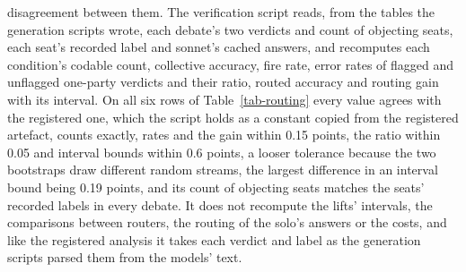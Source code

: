 disagreement between them. The verification script reads, from the tables
the generation scripts wrote, each debate's two verdicts and count of
objecting seats, each seat's recorded label and sonnet's cached answers, and
recomputes each condition's codable
count, collective accuracy, fire rate, error rates of flagged and unflagged
one-party verdicts and their ratio, routed accuracy and routing gain with its
interval. On all six rows of Table~\ref{tab-routing} every value agrees with
the registered one,
which the script holds as a constant copied from the registered artefact,
counts exactly, rates and the gain within 0.15 points, the ratio within 0.05
and interval bounds within 0.6 points, a looser tolerance because the two
bootstraps draw different random streams, the largest difference in an
interval bound being 0.19 points, and its count of objecting seats matches
the seats' recorded labels in every debate. It does not recompute the lifts'
intervals, the comparisons between routers, the routing of the solo's
answers or the costs, and like the registered analysis it takes each verdict
and label as the generation scripts parsed them from the models' text.

\begin{table}[t]
\centering
\caption{\textbf{The intervals of Table~\ref{tab-routing}.}
The three differences of Table~\ref{tab-routing} with their 95
percent item-clustered bootstrap intervals (4,000 draws), in points, per
condition (rows). Routed minus collective is taken over a condition's
codable debates, and collective minus solo and routed minus solo are paired
per debate against the solo of the debate's item and framing. Exchange cut
has no solo pairing (dashes).}
\label{tab-app-routing-ci}

\end{table}

